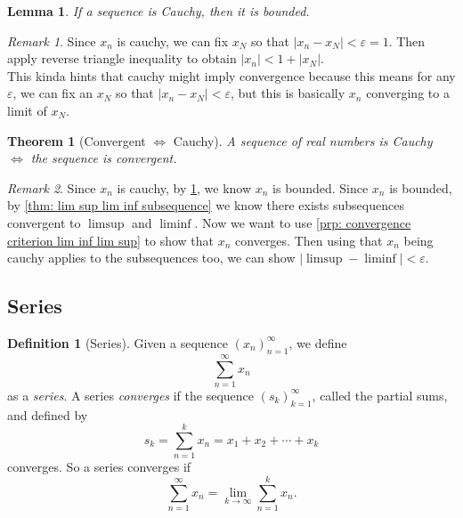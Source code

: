 \documentclass{article}
\newtheorem{theorem}{Theorem}[section]
\newtheorem{lemma}{Lemma}[section]
\theoremstyle{definition}
\newtheorem{definition}{Definition}[section]
\theoremstyle{remark}
\newtheorem{remark}{Remark}[section]
\begin{document}
\begin{lemma}\label{lem:if cauchy then bounded}
If a sequence is Cauchy, then it is bounded. 
\end{lemma}
\begin{remark}
Since $x_n$ is cauchy, we can fix $x_N$ so that $|x_n - x_N| < \varepsilon = 1$. 
Then apply reverse triangle inequality to obtain $|x_n| < 1+|x_N|$.\\
This kinda hints that cauchy might imply convergence because this means for any $\varepsilon$, we
can fix an $x_N$ so that $|x_n - x_N| < \varepsilon$, but this is basically $x_n$ 
converging to a limit of $x_N$.
\end{remark}






\begin{theorem}[Convergent $\iff$ Cauchy]\label{thm:cauchy_convergence}
A sequence of real numbers is Cauchy $ \iff$ the sequence is convergent. 

\end{theorem}

\begin{remark}
Since $x_n$ is cauchy, by \ref{lem:if cauchy then bounded}, we know $x_n$
is bounded. Since $x_n$ is bounded, by \ref{thm: lim sup lim inf subsequence} we know
there exists subsequences convergent to $\limsup$ and $\liminf$. Now 
we want to use \ref{prp: convergence criterion lim inf lim sup} to show that $x_n$ converges.
Then using that $x_n$ being cauchy applies to the subsequences too, we can show $|\limsup - \liminf| < \varepsilon$.
\end{remark}




\subsection{Series}

\begin{definition}[Series]\label{def:series}
Given a sequence $ (x_n)^\infty_{n=1}$, we define
\[
\sum_{n=1}^\infty{x_n}
\]
as a \textit{series}. A series \textit{converges} if the sequence $ (s_k)^\infty_{k=1}$, called the partial sums, and defined by
\[
s_k = \sum_{n = 1}^k{x_n} = x_1 + x_2 + \cdots + x_k
\]
converges. So a series converges if
\[
\sum_{n=1}^\infty{x_n} = \lim_{k \to \infty}{\sum_{n = 1}^k{x_n}}.
\]
\end{definition}
\end{document}
